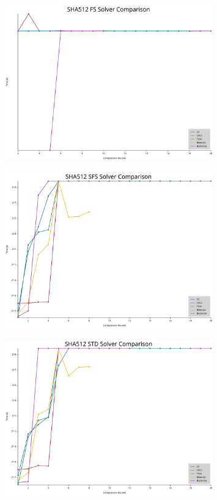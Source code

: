 \begin{figure}[H]
	\centering
	\includegraphics[width=0.8\textwidth]{../../graphs/solver_comparison_SHA512_FS.svg}
\end{figure}

\begin{figure}[H]
	\centering
	\includegraphics[width=0.8\textwidth]{../../graphs/solver_comparison_SHA512_SFS.svg}
\end{figure}

\begin{figure}[H]
	\centering
	\includegraphics[width=0.8\textwidth]{../../graphs/solver_comparison_SHA512_STD.svg}
\end{figure}

